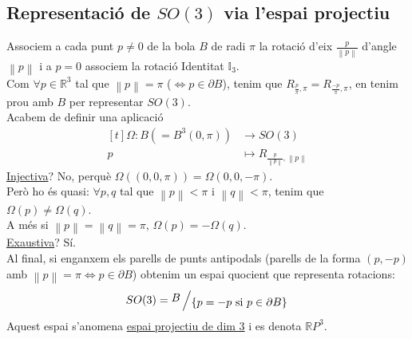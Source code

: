 \documentclass[a4paper,12pt]{article}
\begin{document}
	\subsection{Representació de $SO(3)$ via l'espai projectiu}
	Associem a cada punt $p \neq 0$ de la bola $B$ de radi $\pi$ la rotació d'eix $\frac{p}{\left\lVert p\right\rVert}$
	d'angle $\left\lVert p \right\rVert$ i a $p = 0$ associem la rotació Identitat $\mathbb{I}_3$.\\
	Com $\forall p \in \mathbb{R}^3$ tal que $\left\lVert p\right\rVert = \pi$ ($\Leftrightarrow p\in \partial B$),
	tenim que $R_{\frac{p}{\pi}, \pi} = R_{\frac{-p}{\pi}, \pi}$, en tenim prou amb $B$ per representar $SO(3)$.\\
	Acabem de definir una aplicació\\
	\begin{displaymath}
		\begin{aligned}[t]
			\Omega: B \left(= B^3(0, \pi)\right) &\longrightarrow SO(3)\\
			p &\longmapsto R_{\frac{p}{\left\lVert p\right\rVert}, \left\lVert p \right\rVert}
		\end{aligned}
	\end{displaymath}
	\underline{Injectiva}? No, perquè $\Omega((0,0,\pi)) = \Omega(0,0,-\pi)$.\\
	Però ho és quasi: $\forall p, q$ tal que $\left\lVert p \right\rVert < \pi$ i $\left\lVert q \right\rVert < \pi$, tenim que $\Omega{(p)} \neq \Omega{(q)}$.\\
	A més si $\left\lVert p \right\rVert = \left\lVert q \right\rVert = \pi$, $\Omega{(p)} = -\Omega{(q)}$.\\
	\underline{Exaustiva}? Sí.\\
	Al final, si enganxem els parells de punts antipodals (parells de la forma $(p,-p)$ amb $\left\lVert p \right\rVert = \pi \iff p \in \partial B$)
	obtenim un espai quocient que representa rotacions:\\
	\begin{displaymath}
		SO(3) = \bigslant{B}{\left\{p = -p \text{ si } p \in \partial B\right\}}
	\end{displaymath}
	Aquest espai s'anomena \underline{espai projectiu de dim 3} i es denota $\mathbb{R}P^3$.\\
\end{document}
